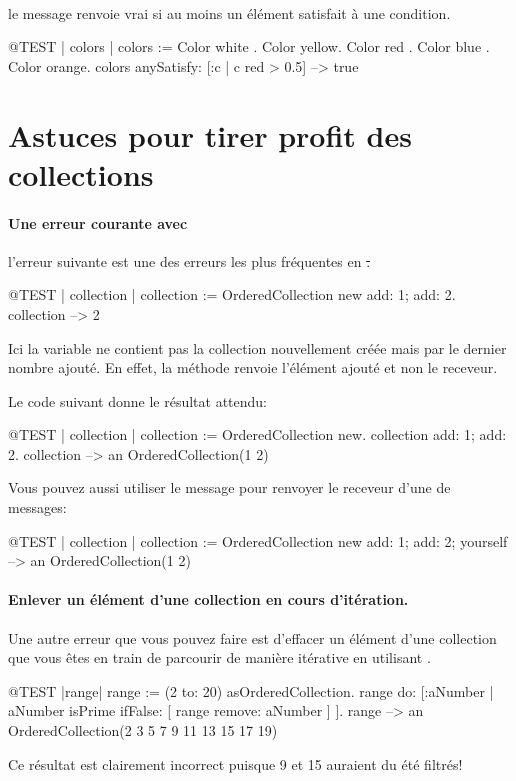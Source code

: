 \documentclass[a4paper,10pt,twoside]{book}
\begin{document}
\paragraph{} le message  renvoie vrai si au moins un \'el\'ement satisfait \`a une condition. 

\begin{code}{@TEST | colors | colors := {Color white . Color yellow. Color red . Color blue . Color orange}.}
colors anySatisfy: [:c | c red > 0.5] --> true
\end{code}
\section{Astuces pour tirer profit des collections}

\paragraph{Une erreur courante avec } l'erreur
suivante est une des erreurs les plus fr\'equentes en \st.

\begin{code}{@TEST | collection | }
collection := OrderedCollection new add: 1; add: 2.
collection --> 2
\end{code}
\noindent
Ici la variable  ne contient pas la collection nouvellement cr\'e\'ee mais par le dernier nombre ajout\'e.
En effet, la m\'ethode  renvoie l'\'el\'ement ajout\'e et non le receveur.

Le code suivant donne le r\'esultat attendu:
\begin{code}{@TEST | collection |}
collection := OrderedCollection new.
collection add: 1; add: 2.
collection --> an OrderedCollection(1 2)
\end{code}

Vous pouvez aussi utiliser le message  pour
renvoyer le receveur d'une  de messages:

\begin{code}{@TEST | collection |}
collection := OrderedCollection new add: 1; add: 2; yourself --> an OrderedCollection(1 2)
\end{code}

\paragraph{Enlever un \'el\'ement d'une collection en cours d'it\'eration.}
Une autre erreur que vous pouvez faire est d'effacer un \'el\'ement d'une collection que vous \^etes en train de parcourir de mani\`ere it\'erative en utilisant .
\begin{code}{@TEST |range|}
range := (2 to: 20) asOrderedCollection.
range do: [:aNumber | aNumber isPrime ifFalse: [ range remove: aNumber ] ].
range --> an OrderedCollection(2 3 5 7 9 11 13 15 17 19)
\end{code}
\noindent
Ce r\'esultat est clairement incorrect puisque 9 et 15 auraient du \'et\'e
filtr\'es!
\end{document}
